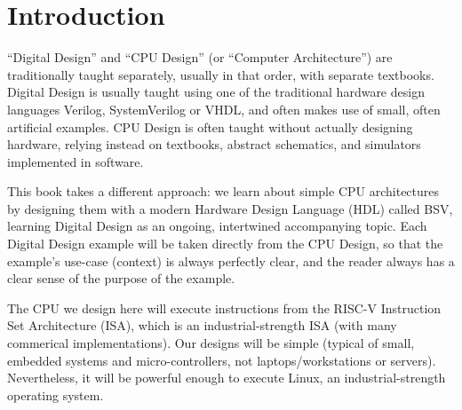 

\chapter{Introduction}



\setcounter{page}{1}
\renewcommand{\thepage}{\arabic{chapter}-\arabic{page}}

\label{ch_intro}


``Digital Design'' and ``CPU Design'' (or ``Computer Architecture'')
are traditionally taught separately, usually in that order, with
separate textbooks.  Digital Design is usually taught using one of the
traditional hardware design languages Verilog, SystemVerilog or VHDL,
and often makes use of small, often artificial examples.  CPU Design
is often taught without actually designing hardware, relying instead
on textbooks, abstract schematics, and simulators implemented in
software.

This book takes a different approach: we learn about simple CPU
architectures by designing them with a modern Hardware Design Language
(HDL) called BSV, learning Digital Design as an ongoing, intertwined
accompanying topic.  Each Digital Design example will be taken
directly from the CPU Design, so that the example's use-case (context)
is always perfectly clear, and the reader always has a clear sense of
the purpose of the example.

The CPU we design here will execute instructions from the RISC-V
Instruction Set Architecture (ISA), which is an industrial-strength
ISA (with many commerical implementations).  Our designs will be
simple (typical of small, embedded systems and micro-controllers, not
laptops/workstations or servers).  Nevertheless, it will be powerful
enough to execute Linux, an industrial-strength operating system.

